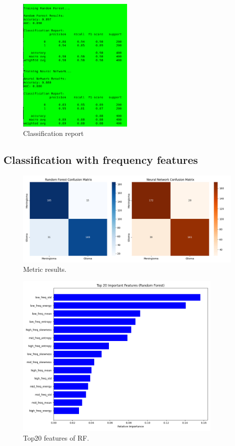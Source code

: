 \documentclass[11pt,a4paper]{report}
\begin{document}
		\begin{figure}[H]
			\centering
			\includegraphics[width=0.5\textwidth]{images/report_pyradiomics.png}
			\caption{Classification report}
			\label{fig1:}
		\end{figure}		

	\subsection{Classification with frequency features}
		\begin{figure}[h]
			\centering
			\includegraphics[width=1.1\textwidth]{images/freq_metrics.png}
			\caption{Metric results.}
			\label{fig1:}
		\end{figure}		

		\begin{figure}[h]
			\centering
			\includegraphics[width=0.9\textwidth]{images/freq_top_rf.png}
			\caption{Top20 features of RF.}
			\label{fig1:}
		\end{figure}		
\end{document}
